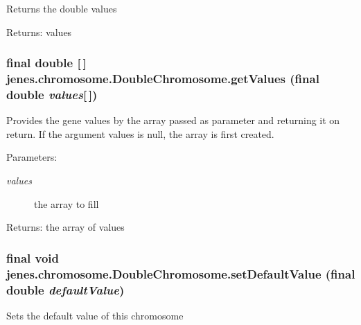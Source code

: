 Returns the double values 

\begin{Desc}
\item[Returns:]values \end{Desc}
\hypertarget{classjenes_1_1chromosome_1_1_double_chromosome_0e7543f12f4ab7591f9b4687c44c801c}{
\subsubsection[getValues]{\setlength{\rightskip}{0pt plus 5cm}final double \mbox{[}$\,$\mbox{]} jenes.chromosome.DoubleChromosome.getValues (final double {\em values}\mbox{[}$\,$\mbox{]})}}
\label{classjenes_1_1chromosome_1_1_double_chromosome_0e7543f12f4ab7591f9b4687c44c801c}


Provides the gene values by the array passed as parameter and returning it on return. If the argument values is null, the array is first created. 

\begin{Desc}
\item[Parameters:]
\begin{description}
\item[{\em values}]the array to fill \end{description}
\end{Desc}
\begin{Desc}
\item[Returns:]the array of values \end{Desc}
\hypertarget{classjenes_1_1chromosome_1_1_double_chromosome_b0f087d0d5ac5ac273c63c4e3af2efff}{
\subsubsection[setDefaultValue]{\setlength{\rightskip}{0pt plus 5cm}final void jenes.chromosome.DoubleChromosome.setDefaultValue (final double {\em defaultValue})}}
\label{classjenes_1_1chromosome_1_1_double_chromosome_b0f087d0d5ac5ac273c63c4e3af2efff}


Sets the default value of this chromosome 

